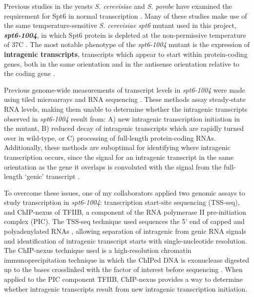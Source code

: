 \documentclass[9pt, letterpaper]{article}
\begin{document}
Previous studies in the yeasts \textit{S. cerevisiae} and \textit{S. pombe} have examined the requirement for Spt6 in normal transcription \cite{cheung2008, degennaro2013, kaplan2003, pathak2018, uwimana2017, vanbakel2013}. Many of these studies make use of the same temperature-sensitive \textit{S. cerevisiae} \textit{spt6} mutant used in this project, \textbf{\textit{spt6-1004}}, in which Spt6 protein is depleted at the non-permissive temperature of 37\textdegree C \cite{kaplan2003}. The most notable phenotype of the \textit{spt6-1004} mutant is the expression of \textbf{intragenic transcripts}, transcripts which appear to start within protein-coding genes, both in the same orientation and in the antisense orientation relative to the coding gene \cite{cheung2008, degennaro2013, kaplan2003, uwimana2017}.

Previous genome-wide measurements of transcript levels in \textit{spt6-1004} were made using tiled microarrays \cite{cheung2008} and RNA sequencing \cite{uwimana2017}. These methods assay steady-state RNA levels, making them unable to determine whether the intragenic transcripts observed in \textit{spt6-1004} result from: A) new intragenic transcription initiation in the mutant, B) reduced decay of intragenic transcripts which are rapidly turned over in wild-type, or C) processing of full-length protein-coding RNAs. Additionally, these methods are suboptimal for identifying where intragenic transcription occurs, since the signal for an intragenic transcript in the same orientation as the gene it overlaps is convoluted with the signal from the full-length `genic' transcript \cite{cheung2008, lickwar2009}.

To overcome these issues, one of my collaborators applied two genomic assays to study transcription in \textit{spt6-1004}: transcription start-site sequencing (TSS-seq), and ChIP-nexus of TFIIB, a component of the RNA polymerase II pre-initiation complex (PIC). The TSS-seq technique used sequences the 5' end of capped and polyadenylated RNAs \cite{arribere2013, malabat2015}, allowing separation of intragenic from genic RNA signals and identification of intragenic transcript starts with single-nucleotide resolution. The ChIP-nexus technique used is a high-resolution chromatin immunoprecipitation technique in which the ChIPed DNA is exonuclease digested up to the bases crosslinked with the factor of interest before sequencing \cite{he2015}. When applied to the PIC component TFIIB, ChIP-nexus provides a way to determine whether intragenic transcripts result from new intragenic transcription initiation.
\end{document}
